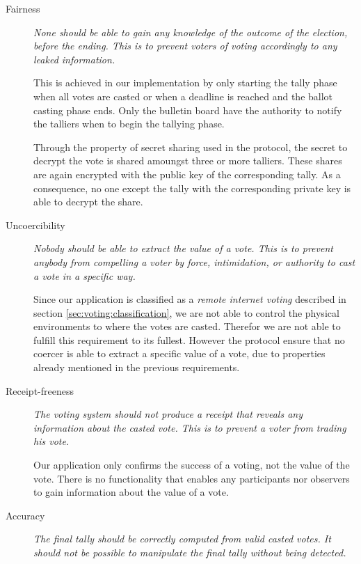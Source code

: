 \begin{description}
    \item[Fairness]
        \textit{None should be able to gain any knowledge of the outcome of the election, before the ending. This is to prevent voters of voting accordingly to any leaked information.}       
    
        This is achieved in our implementation by only starting the tally phase when all votes are casted or when a deadline is 
        reached and the ballot casting phase ends. Only the bulletin board have the authority to notify the talliers when to begin the tallying phase.  
        
        Through the property of secret sharing used in the protocol, the secret to decrypt the
        vote is shared amoungst three or more talliers. These shares are again encrypted with the public key 
        of the corresponding tally. As a consequence, no one except the tally with the corresponding
        private key is able to decrypt the share.
  
           
    \item[Uncoercibility] 
        \textit{Nobody should be able to extract the value of a vote. This is to prevent anybody from compelling a voter by force, intimidation, or authority to cast a vote in a specific way.}
    
        Since our application is classified as a \textit{remote internet voting} described in section \ref{sec:voting:classification}, we are not able to control the physical environments to where the votes are casted. Therefor we are not able to fulfill this requirement to its fullest. However the protocol ensure that no coercer is able to extract a specific value of a vote, due to properties already mentioned in the previous requirements.         
        
    \item[Receipt-freeness] 
        \textit{The voting system should not produce a receipt that reveals any information about the casted vote. This is to prevent a voter from trading his vote.}
            
        Our application only confirms the success of a voting, not the value of the vote. There is no functionality that enables any  participants nor observers to gain information about the value of a vote.         
        
    \item[Accuracy]
        \textit{The final tally should be correctly computed from valid casted votes. It should not be possible to manipulate the final tally without being detected.}
        

\end{description}
